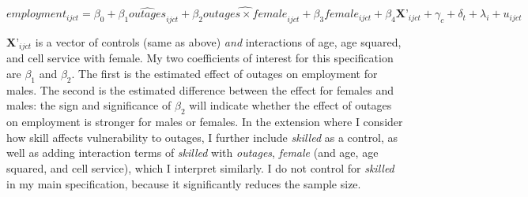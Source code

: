 \documentclass[12pt]{article}
\begin{document}
\begin{equation} \label{eq:eq4}
employment_{ijct} = \beta_0 + \beta_1 \widehat{outages}_{ijct} + \beta_2 \widehat{outages \times female}_{ijct} + \beta_3 {female}_{ijct} + \beta_4 \textbf{X'}_{ijct} + \gamma_{c} + \delta_{t} + \lambda_{i} + u_{ijct}
\end{equation}
\par
\noindent $\textbf{X'}_{ijct}$ is a vector of controls (same as above) \textit{and} interactions of age, age squared, and cell service with female. My two coefficients of interest for this specification are $\beta_1$ and $\beta_2$. The first is the estimated effect of outages on employment for males. The second is the estimated difference between the effect for females and males: the sign and significance of $\beta_2$ will indicate whether the effect of outages on employment is stronger for males or females. In the extension where I consider how skill affects vulnerability to outages, I further include \textit{skilled} as a control, as well as adding interaction terms of \textit{skilled} with \textit{outages}, \textit{female} (and age, age squared, and cell service), which I interpret similarly. I do not control for \textit{skilled} in my main specification, because it significantly reduces the sample size.
\end{document}
